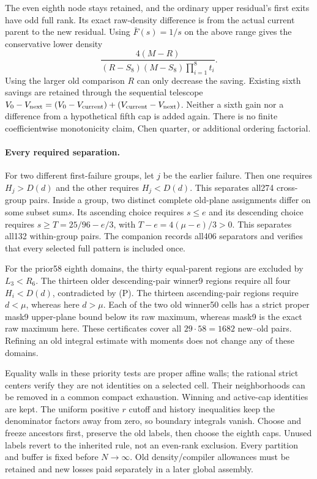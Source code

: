 The even eighth node stays retained, and the ordinary upper
residual's first exits have odd full rank. Its exact raw-density
difference is from the actual current parent to the new residual.
Using $\bar F(s)=1/s$ on the above range gives the conservative
lower density
\[
 \frac{4(M-R)}{(R-S_8)(M-S_8)\prod_{i=1}^8t_i}.
\]
Using the larger old comparison $R$ can only decrease the saving.
Existing sixth savings are retained through the sequential telescope
$V_0-V_{\rm next}=(V_0-V_{\rm current})+(V_{\rm current}-V_{\rm next})$.
Neither a sixth gain nor a difference from a hypothetical fifth cap
is added again. There is no finite coefficientwise monotonicity claim,
Chen quarter, or additional ordering factorial.

\paragraph{Every required separation.}
For two different first-failure groups, let $j$ be the earlier failure.
Then one requires $H_j>D(d)$ and the other requires $H_j<D(d)$.
This separates all274 cross-group pairs. Inside a group, two distinct
complete old-plane assignments differ on some subset sum$s$.
Its ascending choice requires $s\le e$ and its descending choice
requires $s\ge T=25/96-e/3$, with
$T-e=4(\mu-e)/3>0$. This separates all132 within-group pairs.
The companion records all406 separators and verifies that every
selected full pattern is included once.

For the prior58 eighth domains, the thirty equal-parent regions
are excluded by $L_3<R_6$. The thirteen older descending-pair
winner9 regions require all four $H_i<D(d)$, contradicted by (P).
The thirteen ascending-pair regions require $d<\mu$, whereas here
$d>\mu$. Each of the two old winner50 cells has a strict proper
mask9 upper-plane bound below its raw maximum, whereas mask9 is
the exact raw maximum here. These certificates cover all
$29\cdot58=1682$ new--old pairs. Refining an old integral estimate
with moments does not change any of these domains.

Equality walls in these priority tests are proper affine walls;
the rational strict centers verify they are not identities on a
selected cell. Their neighborhoods can be removed in a common
compact exhaustion. Winning and active-cap identities are kept.
The uniform positive $r$ cutoff and history inequalities keep the
denominator factors away from zero, so boundary integrals vanish.
Choose and freeze ancestors first, preserve the old labels, then
choose the eighth caps. Unused labels revert to the inherited rule,
not an even-rank exclusion. Every partition and buffer is fixed
before $N\to\infty$. Old density/compiler allowances must be
retained and new losses paid separately in a later global assembly.

